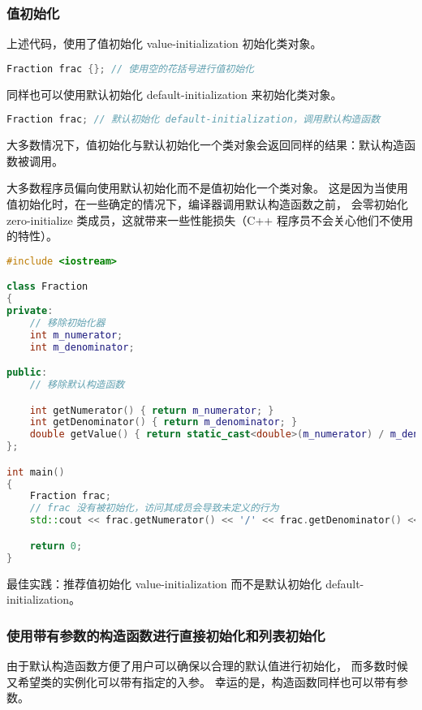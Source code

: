 \documentclass[../../LearnCpp.tex]{subfiles}
\begin{document}
\subsubsection*{值初始化}

上述代码，使用了值初始化 value-initialization 初始化类对象。

\begin{lstlisting}[language=C++]
Fraction frac {}; // 使用空的花括号进行值初始化
\end{lstlisting}

同样也可以使用默认初始化 default-initialization 来初始化类对象。

\begin{lstlisting}[language=C++]
Fraction frac; // 默认初始化 default-initialization，调用默认构造函数
\end{lstlisting}

大多数情况下，值初始化与默认初始化一个类对象会返回同样的结果：默认构造函数被调用。

大多数程序员偏向使用默认初始化而不是值初始化一个类对象。
这是因为当使用值初始化时，在一些确定的情况下，编译器调用默认构造函数之前，
会零初始化 zero-initialize 类成员，这就带来一些性能损失（C++ 程序员不会关心他们不使用的特性）。

\begin{lstlisting}[language=C++]
#include <iostream>

class Fraction
{
private:
    // 移除初始化器
    int m_numerator;
    int m_denominator;

public:
    // 移除默认构造函数

    int getNumerator() { return m_numerator; }
    int getDenominator() { return m_denominator; }
    double getValue() { return static_cast<double>(m_numerator) / m_denominator; }
};

int main()
{
    Fraction frac;
    // frac 没有被初始化，访问其成员会导致未定义的行为
    std::cout << frac.getNumerator() << '/' << frac.getDenominator() << '\n';

    return 0;
}
\end{lstlisting}

最佳实践：推荐值初始化 value-initialization 而不是默认初始化 default-initialization。

\subsubsection*{使用带有参数的构造函数进行直接初始化和列表初始化}

由于默认构造函数方便了用户可以确保以合理的默认值进行初始化，
而多数时候又希望类的实例化可以带有指定的入参。
幸运的是，构造函数同样也可以带有参数。
\end{document}
